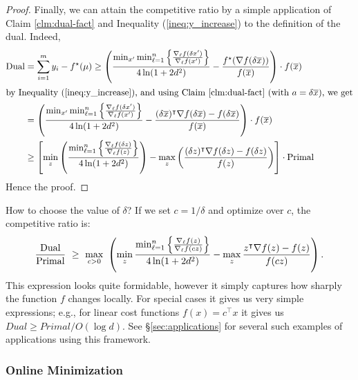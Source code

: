 \documentclass[letterpaper,11pt]{article}
\newcommand{\ox}{\ensuremath{\overline{x}}\xspace}
\newcommand{\trans}{\intercal}
\def\ox{\overline{x}}
\begin{document}
\begin{proof}
Finally, we can attain the competitive ratio by a simple application of Claim \ref{clm:dual-fact} and Inequality (\ref{ineq:y_increase}) to the definition of the dual. Indeed,
\begin{align*}
    \mbox{Dual} & = \sum_{i=1}^{m}y_i - f^\star(\mu) \geq  \left(\frac{\min_{x'}\min_{\ell=1}^{n}\left\{\frac{\nabla_\ell f(\delta x')}{\nabla_\ell f(x')}\right\}}{4\ln(1+2d^2)} - \frac{f^\star(\nabla f(\delta\ox)) }{f(\ox)}\right) \cdot f(\ox) \\
\intertext{by Inequality~(\ref{ineq:y_increase}), and using Claim~\ref{clm:dual-fact} (with $a=\delta \ox$), we get}
    &= \left(\frac{\min_{x'}\min_{\ell=1}^{n}\left\{\frac{\nabla_\ell f(\delta x')}{\nabla_\ell f(x')}\right\}}{4\ln(1+2d^2)} - \frac{(\delta\ox)^\trans\nabla f(\delta \ox) - f(\delta \ox) }{f(\ox)}\right) \cdot f(\ox)
\\
    & \geq \left[\min_{z} \left(\frac{\min_{\ell=1}^{n}\left\{\frac{\nabla_\ell f(\delta z)}{\nabla_\ell f(z)}\right\}}{4\ln(1+2d^2)}\right) - \max_{z}\left(\frac{(\delta z)^\trans \nabla f(\delta z) - f(\delta z) }{f(z)}\right)\right] \cdot \mbox{Primal}
  \end{align*}
  Hence the proof.
\end{proof}

How to choose the value of $\delta$? If we  set $c = 1/\delta$ and optimize over $c$, the competitive ratio is:
\begin{equation}\label{eq:gen-apx}
  \frac{{\rm Dual}}{{\rm Primal}}\,\,\ge \,\, \max_{c > 0} \,\,
  \left(\min_{z} \frac{\min_{\ell=1}^{n}\left\{\frac{\nabla_\ell f(z)}{\nabla_\ell f(cz)}\right\}}{4\ln(1+2d^2)} -
  \max_{z} \frac{z^\trans \nabla f(z) - f(z) }{f(c z)}\right).
\end{equation}
This expression looks quite formidable, however it simply captures how
sharply the function $f$ changes locally. For special cases it gives
us very simple expressions; e.g., for linear cost functions $f(x) =
c^\trans x$ it gives us $Dual \geq Primal/O(\log d)$. See
\S\ref{sec:applications} for several such examples of applications using
this framework.

\subsubsection{Online Minimization}
\label{sec:minimization}
\end{document}
